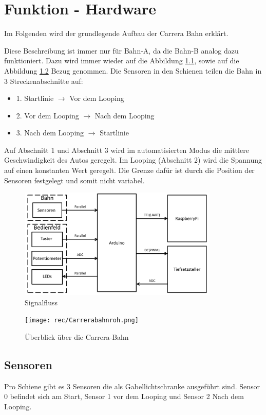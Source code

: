 \documentclass[a4paper, 11pt]{report}
\begin{document}
\chapter{Funktion - Hardware}
	Im Folgenden wird der grundlegende Aufbau der Carrera Bahn erklärt.

	Diese Beschreibung ist immer nur für Bahn-A, da die
	Bahn-B analog dazu funktioniert. Dazu wird immer wieder auf die Abbildung \ref{img:signalfluss}, sowie auf die \\Abbildung
	\ref{img:carrerakomplett} Bezug genommen.
	Die Sensoren in den Schienen teilen die Bahn in 3 Streckenabschnitte auf:
	\begin{itemize}
		\item{1.} Startlinie $\rightarrow$ Vor dem Looping
		\item{2.} Vor dem Looping $\rightarrow$ Nach dem Looping
		\item{3.} Nach dem Looping $\rightarrow$ Startlinie
	\end{itemize}
	Auf Abschnitt 1 und Abschnitt 3 wird im automatisierten Modus die mittlere Geschwindigkeit des Autos geregelt.
	Im Looping (Abschnitt 2) wird die Spannung auf einen konstanten Wert geregelt.
	Die Grenze dafür ist durch die Position der Sensoren festgelegt und somit nicht variabel.
	\begin{figure}[ht]
		\centering
		\includegraphics[width=0.85\textwidth]{rec/signalfluss.pdf}
		\caption{Signalfluss}
		\label{img:signalfluss}
	\end{figure}
	\begin{figure}[ht]
	\centering
	\texttt{[image: rec/Carrerabahnroh.png]}
	\caption{Überblick über die Carrera-Bahn}
	\label{img:carrerakomplett}
	\end{figure}
	\newpage

	\section{Sensoren}
		Pro Schiene gibt es 3 Sensoren die als Gabellichtschranke ausgeführt sind. Sensor 0 befindet sich am Start, Sensor 1 vor dem Looping und 		Sensor 2 Nach dem Looping.\\
\end{document}
